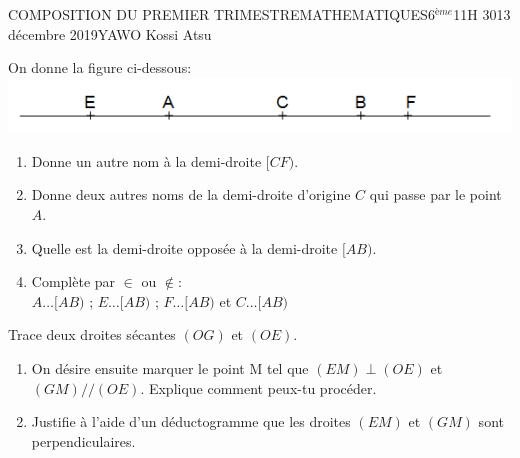 \documentclass[12pt,a4paper]{book}
\newcommand{\prof}{YAWO Kossi Atsu}
\newcommand{\matiere}{MATHEMATIQUES}
\newcommand{\classe}{6$^{ème}$}
\begin{document}
\begin{devoir}{COMPOSITION DU PREMIER TRIMESTRE}{\matiere}{\classe}{1}{1H 30}{13 décembre 2019}{\prof}
\vspace{0.5cm}

\begin{exo}[4]
On donne la figure ci-dessous:\\
\includegraphics[scale=0.9]{images/td1img1.png}
\begin{enumerate}
\item Donne un autre nom à la demi-droite $[CF)$.
\item Donne deux autres noms de la demi-droite d'origine $C$ qui passe par le point $A$.
\item Quelle est la demi-droite opposée à la demi-droite $[AB)$.
\item Complète par $\in$ ou $\notin$:\\
$A \ldots [AB)$ \qquad ; \qquad $E \ldots [AB)$ \qquad ; \qquad $F \ldots [AB)$ \qquad et \qquad $C \ldots [AB)$
\end{enumerate}
\end{exo}

\vspace{0.5cm}
\begin{exo}[3]
Trace deux droites sécantes $(OG)$ et $(OE)$.
\begin{enumerate}
\item On désire ensuite marquer le point M tel que $(EM) \perp (OE)$ et $(GM)//(OE)$. Explique comment peux-tu procéder.
\item Justifie à l'aide d'un déductogramme que les droites $(EM)$ et $(GM)$ sont perpendiculaires.
\end{enumerate} 
\end{exo}

\tableofcompetences
\end{devoir}
\end{document}
